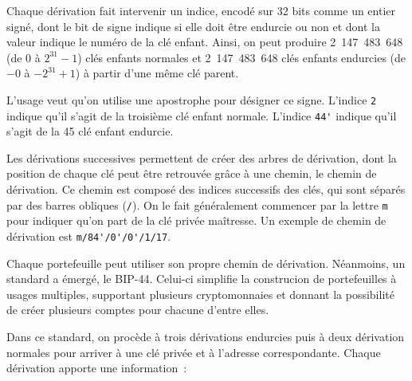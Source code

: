 Chaque dérivation fait intervenir un indice, encodé sur 32 bits comme un entier signé, dont le bit de signe indique si elle doit être endurcie ou non et dont la valeur indique le numéro de la clé enfant. Ainsi, on peut produire 2~147~483~648 (de $0$ à $2^{31} - 1$) clés enfants normales et 2~147~483~648 clés enfants endurcies (de $-0$ à $- 2^{31} + 1$) à partir d'une même clé parent.

L'usage veut qu'on utilise une apostrophe pour désigner ce signe. L'indice \verb?2? indique qu'il s'agit de la troisième clé enfant normale. L'indice \verb?44'? indique qu'il s'agit de la 45\ieme{} clé enfant endurcie.


Les dérivations successives permettent de créer des arbres de dérivation, dont la position de chaque clé peut être retrouvée grâce à une chemin, le chemin de dérivation. Ce chemin est composé des indices successifs des clés, qui sont séparés par des barres obliques (\verb?/?). On le fait généralement commencer par la lettre \verb?m? pour indiquer qu'on part de la clé privée maîtresse. Un exemple de chemin de dérivation est \verb?m/84'/0'/0'/1/17?.

Chaque portefeuille peut utiliser son propre chemin de dérivation. Néanmoins, un standard a émergé, le BIP-44. Celui-ci simplifie la construcion de portefeuilles à usages multiples, supportant plusieurs cryptomonnaies et donnant la possibilité de créer plusieurs comptes pour chacune d'entre elles.

Dans ce standard, on procède à trois dérivations endurcies puis à deux dérivation normales pour arriver à une clé privée et à l'adresse correspondante. Chaque dérivation apporte une information~:

